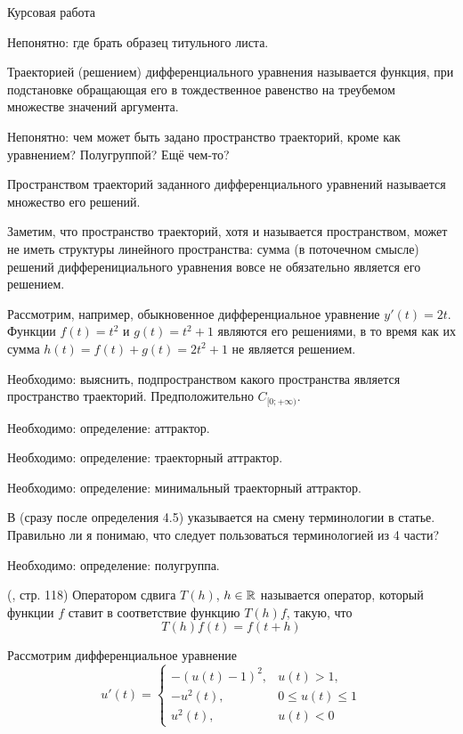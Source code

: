 
\LARGE



Курсовая работа


Непонятно: где брать образец титульного листа.


\opred
Траекторией (решением) дифференциального уравнения называется функция, при подстановке обращающая его в тождественное равенство на треубемом множестве значений аргумента.


Непонятно: чем может быть задано пространство траекторий, кроме как уравнением?
Полугруппой?
Ещё чем-то?


\opred
Пространством траекторий заданного дифференциального уравнений называется множество его решений.

Заметим, что пространство траекторий, хотя и называется пространством, может не иметь структуры линейного пространства:
сумма (в поточечном смысле) решений дифференициального уравнения вовсе не обязательно является его решением.

Рассмотрим, например, обыкновенное дифференциальное уравнение $y'(t) = 2t$.
Функции $f(t)=t^2$ и $g(t)=t^2 +1$ являются его решениями, в то время как их сумма $h(t) = f(t) + g(t) = 2t^2 + 1$ не является решением.


Необходимо: выяснить, подпространством какого пространства является пространство траекторий.
Предположительно $C_{[0;+\infty)}$.


Необходимо: определение: аттрактор.


Необходимо: определение: траекторный аттрактор.


Необходимо: определение: минимальный траекторный аттрактор.

В \cite{Kondratyev} (сразу после определения 4.5) указывается на смену терминологии в статье.
Правильно ли я понимаю, что следует пользоваться терминологией из 4 части?


Необходимо: определение: полугруппа.


\opred (\cite{Zelenaya}, стр. 118)
Оператором сдвига $T(h)$, $h\in\mathbb{R}$ называется оператор, который функции $f$ ставит в соответствие функцию $T(h)f$, такую, что
$$
T(h)f(t)=f(t+h)
$$





Рассмотрим дифференциальное уравнение
\begin{equation}
	u'(t)=
	\left\{
		\begin{array}{ll}
			-(u(t)-1)^2, & u(t) > 1, \\
			-u^2 (t)   , & 0 \leq u(t) \leq 1 \\
			u^2 (t)    , & u(t) < 0
		\end{array}
	\right.
\end{equation}

